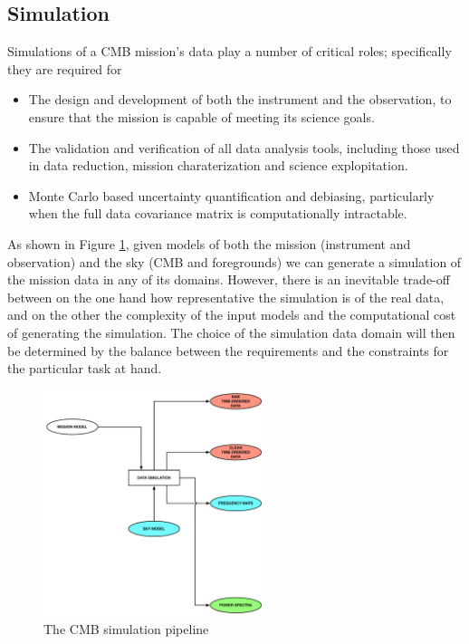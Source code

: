 \newpage

\subsection{Simulation}

Simulations of a CMB mission's data play a number of critical roles; specifically they are required for
\begin{itemize}
\item The design and development of both the instrument and the observation, to ensure that the mission is capable of meeting its science goals.
\item The validation and verification of all data analysis tools, including those used in data reduction, mission charaterization and science explopitation.
\item Monte Carlo based uncertainty quantification and debiasing, particularly when the full data covariance matrix is computationally intractable.
\end{itemize}

As shown in Figure \ref{fig_sim}, given models of both the mission (instrument and observation) and the sky (CMB and foregrounds) we can generate a simulation of the mission data in any of its domains. However, there is an inevitable trade-off between on the one hand how representative the simulation is of the real data, and on the other the complexity of the input models and the computational cost of generating the simulation. The choice of the simulation data domain will then be determined by the balance between the requirements and the constraints for the particular task at hand.

\begin{figure}[htbp]
\includegraphics[width=0.575\textwidth]{Analysis/sim}
\caption{The CMB simulation pipeline}
\label{fig_sim}
\end{figure}

